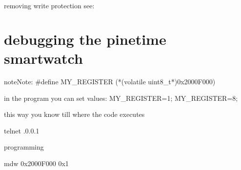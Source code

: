 \documentclass[letterpaper,10pt,english]{sphinxmanual}
\begin{document}
removing write protection see:   {\hyperref[\detokenize{hacking/writeprotection:flashing}]{}}


\chapter{debugging   the pinetime smartwatch}
\label{\detokenize{hacking/debugging:debugging-the-pinetime-smartwatch}}\label{\detokenize{hacking/debugging::doc}}\label{\detokenize{hacking/debugging::doc}}
\begin{sphinxVerbatim}[commandchars=\\\{\}]
       
       
              
        
\end{sphinxVerbatim}

\begin{sphinxadmonition}{note}{Note:}
\#define MY\_REGISTER (*(volatile uint8\_t*)0x2000F000)

in the program you can set values:
MY\_REGISTER=1;
MY\_REGISTER=8;

this way you know till where the code executes
\end{sphinxadmonition}

\begin{sphinxVerbatim}[commandchars=\\\{\}]
telnet .0.0.1 
\end{sphinxVerbatim}

programming

\begin{sphinxVerbatim}[commandchars=\\\{\}]
\PYG{g+go}{Escape character is \PYGZsq{}\PYGZca{}]\PYGZsq{}.}
mdw 0x2000F000 0x1

\end{sphinxVerbatim}
\end{document}
